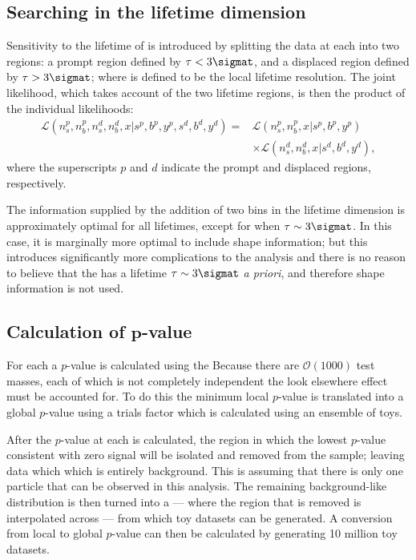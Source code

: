 \subsection{Searching in the lifetime dimension}
Sensitivity to the lifetime of \db is introduced by splitting the data at each  into two
regions: a prompt region defined by $\tau<3\sigmat$, and a displaced region defined by
$\tau>3\sigmat$; where \sigmat is defined to be the local lifetime resolution.
The joint likelihood, which takes account of the two lifetime regions, is then the product of the
individual likelihoods:
\begin{align}
  \mathcal{L}(n^p_s, n^p_b, n^d_s, n^d_b, x | s^p, b^p, y^p, s^d, b^d, y^d) =&
  \mathcal{L}(n^p_s, n^p_b, x | s^p, b^p, y^p)\\\nonumber
  &\times\mathcal{L}(n^d_s, n^d_b, x | s^d, b^d, y^d),
  \label{eq:db:liketau}
\end{align}
where the superscripts $p$ and $d$ indicate the prompt and displaced regions, respectively.

The information supplied by the addition of two bins in the lifetime dimension is approximately
optimal for all \db lifetimes, except for when $\tau\sim3\sigmat$.
In this case, it is marginally more optimal to include shape information; but this introduces
significantly more complications to the analysis and there is no reason to believe that the \db has
a lifetime $\tau\sim3\sigmat$ \emph{a priori}, and therefore shape information is not used.


\subsection[Calculation of $p$-value]
{Calculation of $\boldsymbol{p}$-value}
For each  a $p$-value is calculated using the
Because there are $\mathcal{O}(1000)$ test masses, each of which is not completely independent the
look elsewhere effect must be accounted for.
To do this the minimum local $p$-value is translated into a global $p$-value using a trials factor
which is calculated using an ensemble of toys.

After the $p$-value at each  is calculated, the region in which the lowest $p$-value
consistent with zero signal will be isolated and removed from the sample; leaving data which
which is entirely background.
This is assuming that there is only one \np particle that can be observed in this analysis.
The remaining background-like distribution is then turned into a \PDF --- where the region that is
removed is interpolated across --- from which toy datasets can be generated.
A conversion from local to global $p$-value can then be calculated by generating 10 million toy
datasets.


